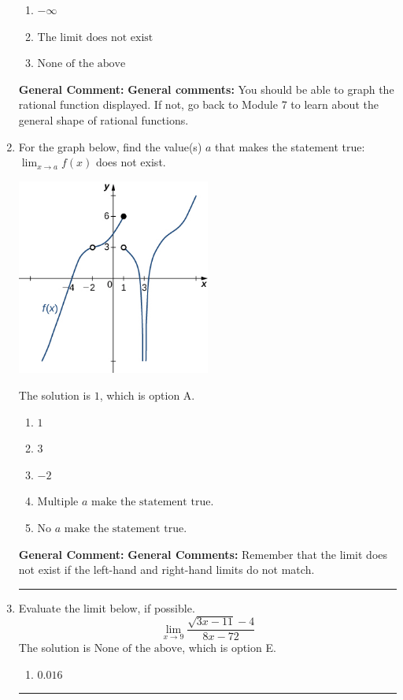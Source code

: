 \documentclass{extbook}[14pt]
\newcommand{\litem}[1]{\item #1

\rule{\textwidth}{0.4pt}}
\begin{document}
\begin{enumerate}
{\begin{enumerate}[label=\Alph*.]
\item \( -\infty \)


\item \( \text{The limit does not exist} \)


\item \( \text{None of the above} \)


\end{enumerate}

\textbf{General Comment:} \textbf{General comments:} You should be able to graph the rational function displayed. If not, go back to Module 7 to learn about the general shape of rational functions.
}
\litem{
For the graph below, find the value(s) $a$ that makes the statement true: $ \displaystyle \lim_{x \rightarrow a} f(x)$ does not exist.

\begin{center}
    \includegraphics[width=0.5\textwidth]{../Figures/evaluateLimitGraphicallyCopyA.png}
\end{center}


The solution is \( 1 \), which is option A.\begin{enumerate}[label=\Alph*.]
\item \( 1 \)


\item \( 3 \)


\item \( -2 \)


\item \( \text{Multiple } a \text{ make the statement true}. \)


\item \( \text{No } a \text{ make the statement true}. \)


\end{enumerate}

\textbf{General Comment:} \textbf{General Comments:} Remember that the limit does not exist if the left-hand and right-hand limits do not match.
}
\litem{
Evaluate the limit below, if possible.
\[ \lim_{x \rightarrow 9} \frac{\sqrt{3x - 11} - 4}{8x - 72} \]The solution is \( \text{None of the above} \), which is option E.\begin{enumerate}[label=\Alph*.]
\item \( 0.016 \)


\end{enumerate}}
\end{enumerate}
\end{document}
